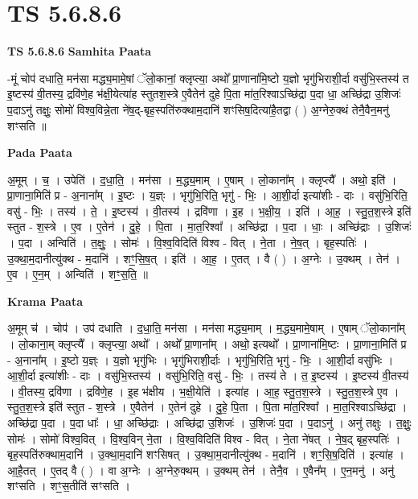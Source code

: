 \documentclass[17pt]{extarticle}
\begin{document}
\section{ TS 5.6.8.6 }

\textbf{TS 5.6.8.6 } \newline
\textbf{Samhita Paata} \newline

-मूं चोप॑ दधाति॒ मन॑सा मद्ध्य॒मामे॒षां ॅलो॒कानां॒ क्लृप्त्या॒ अथो᳚ प्रा॒णाना॑मि॒ष्टो य॒ज्ञो भृगु॑भिराशी॒र्दा वसु॑भि॒स्तस्य॑ त इ॒ष्टस्य॑ वी॒तस्य॒ द्रवि॑णे॒ह भ॑क्षी॒येत्या॑ह स्तुतश॒स्त्रे ए॒वैतेन॑ दुहे पि॒ता मा॑त॒रिश्वाऽच्छि॑द्रा प॒दा धा॒ अच्छि॑द्रा उ॒शिजः॑ प॒दाऽनु॑ तक्षुः॒ सोमो॑ विश्व॒विन्ने॒ता ने॑ष॒द्-बृह॒स्पति॑रुक्थाम॒दानि॑ शꣳसिष॒दित्या॑है॒तद्वा ( ) अ॒ग्नेरु॒क्थं तेनै॒वैन॒मनु॑ शꣳसति ॥ \newline

\textbf{Pada Paata} \newline

अ॒मूम् । च॒ । उपेति॑ । द॒धा॒ति॒ । मन॑सा । म॒द्ध्य॒माम् । ए॒षाम् । लो॒काना᳚म् । क्लृप्त्यै᳚ । अथो॒ इति॑ । प्रा॒णाना॒मिति॑ प्र - अ॒नाना᳚म् । इ॒ष्टः । य॒ज्ञ्ः । भृगु॑भि॒रिति॒ भृगु॑ - भिः॒ । आ॒शी॒र्दा इत्या॑शीः - दाः । वसु॑भि॒रिति॒ वसु॑ - भिः॒ । तस्य॑ । ते॒ । इ॒ष्टस्य॑ । वी॒तस्य॑ । द्रवि॑णा । इ॒ह । भ॒क्षी॒य॒ । इति॑ । आ॒ह॒ । स्तु॒त॒श॒स्त्रे इति॑ स्तुत - श॒स्त्रे । ए॒व । ए॒तेन॑ । दु॒हे॒ । पि॒ता । मा॒त॒रिश्वा᳚ । अच्छि॑द्रा । प॒दा । धाः॒ । अच्छि॑द्राः । उ॒शिजः॑ । प॒दा । अन्विति॑ । त॒क्षुः॒ । सोमः॑ । वि॒श्व॒विदिति॑ विश्व - वित् । ने॒ता । ने॒ष॒त् । बृह॒स्पतिः॑ । उ॒क्था॒म॒दानीत्यु॑क्थ - म॒दानि॑ । शꣳ॒॒सि॒ष॒त् । इति॑ । आ॒ह॒ । ए॒तत् । वै ( ) । अ॒ग्नेः । उ॒क्थम् । तेन॑ । ए॒व । ए॒न॒म् । अन्विति॑ । शꣳ॒॒स॒ति॒ ॥  \newline


\textbf{Krama Paata} \newline

अ॒मूम् च॑ । चोप॑ । उप॑ दधाति । द॒धा॒ति॒ मन॑सा । मन॑सा मद्ध्य॒माम् । म॒द्ध्य॒मामे॒षाम् । ए॒षाम् ॅलो॒काना᳚म् । लो॒काना॒म् क्लृप्त्यै᳚ । क्लृप्त्या॒ अथो᳚ । अथो᳚ प्रा॒णाना᳚म् । अथो॒ इत्यथो᳚ । प्रा॒णाना॑मि॒ष्टः । प्रा॒णाना॒मिति॑ प्र - अ॒नाना᳚म् । इ॒ष्टो य॒ज्ञ्ः । य॒ज्ञो भृगु॑भिः । भृगु॑भिराशी॒र्दाः । भृगु॑भि॒रिति॒ भृगु॑ - भिः॒ । आ॒शी॒र्दा वसु॑भिः । आ॒शी॒र्दा इत्या॑शीः - दाः । वसु॑भि॒स्तस्य॑ । वसु॑भि॒रिति॒ वसु॑ - भिः॒ । तस्य॑ ते । त॒ इ॒ष्टस्य॑ । इ॒ष्टस्य॑ वी॒तस्य॑ । वी॒तस्य॒ द्रवि॑णा । द्रवि॑णे॒ह । इ॒ह भ॑क्षीय । भ॒क्षी॒येति॑ । इत्या॑ह । आ॒ह॒ स्तु॒त॒श॒स्त्रे । स्तु॒त॒श॒स्त्रे ए॒व । स्तु॒त॒श॒स्त्रे इति॑ स्तुत - श॒स्त्रे । ए॒वैतेन॑ । ए॒तेन॑ दुहे । दु॒हे॒ पि॒ता । पि॒ता मा॑त॒रिश्वा᳚ । मा॒त॒रिश्वाऽच्छि॑द्रा । अच्छि॑द्रा प॒दा । प॒दा धाः᳚ । धा॒ अच्छि॑द्राः । अच्छि॑द्रा उ॒शिजः॑ । उ॒शिजः॑ प॒दा । प॒दाऽनु॑ । अनु॑ तक्षुः । त॒क्षुः॒ सोमः॑ । सोमो॑ विश्व॒वित् । वि॒श्व॒विन् ने॒ता । वि॒श्व॒विदिति॑ विश्व - वित् । ने॒ता ने॑षत् । ने॒ष॒द् बृह॒स्पतिः॑ । बृह॒स्पति॑रुक्थाम॒दानि॑ । उ॒क्था॒म॒दानि॑ शꣳसिषत् । उ॒क्था॒म॒दानीत्यु॑क्थ - म॒दानि॑ । शꣳ॒॒सि॒ष॒दिति॑ । इत्या॑ह । आ॒है॒तत् । ए॒तद् वै ( ) । वा अ॒ग्नेः । अ॒ग्नेरु॒क्थम् । उ॒क्थम् तेन॑ । तेनै॒व । ए॒वैन᳚म् । ए॒न॒मनु॑ । अनु॑ शꣳसति । शꣳ॒॒स॒तीति॑ सꣳसति । \newline
\end{document}
